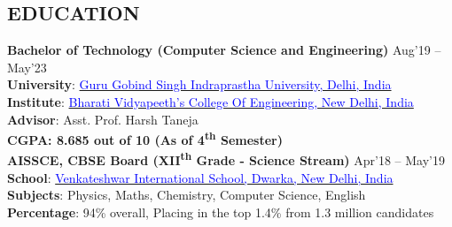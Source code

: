 \documentclass[11pt]{res} %
\newcommand{\titlegap}{5pt} %
\begin{document}
\begin{resume}

\section{EDUCATION} %

\vspace{\titlegap}

{
\bf Bachelor of Technology (Computer Science and Engineering)} \hfill Aug'19 -- May'23 \\ 
\textbf{University}: \href{http://www.ipu.ac.in/}{\textcolor{blue}{Guru Gobind Singh Indraprastha University, Delhi, India}}\\
\textbf{Institute}: \href{http://bvcoend.ac.in}{\textcolor{blue}{Bharati Vidyapeeth's College Of Engineering, New Delhi, India}}\\
\textbf{Advisor}: Asst. Prof. Harsh Taneja\\
\textbf{CGPA: 8.685 out of 10 (As of 4\textsuperscript{th} Semester)}\\

{\bf AISSCE, CBSE Board (XII\textsuperscript{th} Grade - Science Stream)} \hfill Apr'18 -- May'19 \\ 
\textbf{School}: \href{https://www.vis10dwarka.com/}{\textcolor{blue}{Venkateshwar International School, Dwarka, New Delhi, India}} \\
\textbf{Subjects}: Physics, Maths, Chemistry, Computer Science, English\\
\textbf{Percentage}: 94\% overall, Placing in the top 1.4\% from 1.3 million candidates \\

\vspace{0.1in}
\hline



\end{resume}
\end{document}
